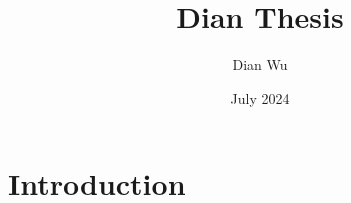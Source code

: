 \documentclass{article}
\title{Dian Thesis}
\author{Dian Wu}
\date{July 2024}
\begin{document}
\maketitle

\section{Introduction}
\end{document}
